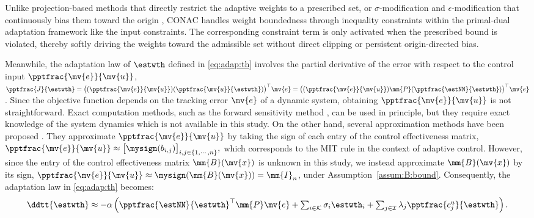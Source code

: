\documentclass[letterpaper, journal]{IEEEtran}
\begin{document}
\begin{remark} \label{rem:weight:bound}
  Unlike projection-based methods that directly restrict the adaptive weights to a prescribed set, or $\sigma$-modification and $\epsilon$-modification that continuously bias them toward the origin \cite{Ryu:2025ab}, CONAC handles weight boundedness through inequality constraints within the primal-dual adaptation framework like the input constraints.
  The corresponding constraint term is only activated when the prescribed bound is violated, thereby softly driving the weights toward the admissible set without direct clipping or persistent origin-directed bias.
\end{remark}

Meanwhile, the adaptation law of $\estwth$ defined in \eqref{eq:adap:th} involves the partial derivative of the error with respect to the control input $\pptfrac{\mv{e}}{\mv{u}}$, \ie 
$
    \pptfrac{J}{\estwth}
    =
    \big(
        (\pptfrac{\mv{e}}{\mv{u}})
        (\pptfrac{\mv{u}}{\estwth})
    \big)
    ^\top \mv{e}
    =
    \big(
        (\pptfrac{\mv{e}}{\mv{u}})
        \mm{P}
        (\pptfrac{\estNN}{\estwth})
    \big)
    ^\top \mv{e}
$. 
Since the objective function depends on the tracking error $\mv{e}$ of a dynamic system, obtaining $\pptfrac{\mv{e}}{\mv{u}}$ is not straightforward. 
Exact computation methods, such as the forward sensitivity method \cite{Khalil:2002aa,Ryu:2025ab}, can be used in principle, but they require exact knowledge of the system dynamics which is not available in this study.
On the other hand, several approximation methods have been proposed \cite{Douratsos:2007aa,Saerens:1991aa}.
They approximate $\pptfrac{\mv{e}}{\mv{u}}$ by taking the sign of each entry of the control effectiveness matrix, \ie
$
  \pptfrac{\mv{e}}{\mv{u}}
  \approx
  \big[
    \mysign
    (
    b_{i,j}
    )
  \big]_{i,j\in\{1,\cdots,n\}}
  ,
$
which corresponds to the MIT rule in the context of adaptive control.
However, since the entry of the control effectiveness matrix $\mm{B}(\mv{x})$ is unknown in this study, we instead approximate $\mm{B}(\mv{x})$ by its sign, \ie $\pptfrac{\mv{e}}{\mv{u}}\approx\mysign(\mm{B}(\mv{x}))=\mm{I}_{n}$, under Assumption~\ref{assum:B:bound}.
Consequently, the adaptation law in \eqref{eq:adap:th} becomes:
\begin{equation}
  \ddtt{\estwth}
  \approx
  -\alpha 
  \left(
    {\pptfrac{\estNN}
    {\estwth}}^\top
    \mm{P}
    \mv{e}
    +
    \textstyle\sum_{i\in\mathcal{K}}
    \sigma_i 
    \estwth_i
    +
    \textstyle\sum_{j\in\mathcal{I}}
    \lambda_j 
    \pptfrac{c^{u}_{j}}{\estwth}
  \right)
  .
  \label{eq:adap:th:approx}
\end{equation}
\end{document}
